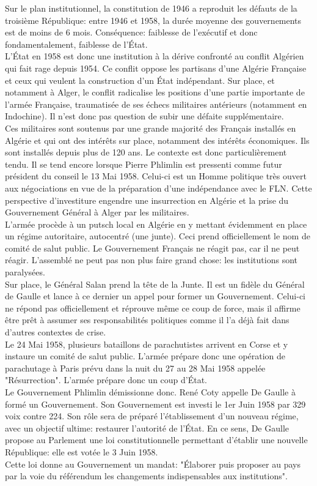 \documentclass[12pt, a4paper, openany]{book}
\begin{document}
Sur le plan institutionnel, la constitution de 1946 a reproduit les défauts de la troisième République: entre 1946 et 1958, la durée moyenne des gouvernements est de moins de 6 mois. Conséquence: faiblesse de l'exécutif et donc fondamentalement, faiblesse de l'État. \\
L'État en 1958 est donc une institution à la dérive confronté au conflit Algérien qui fait rage depuis 1954. Ce conflit oppose les partisans d'une Algérie Française et ceux qui veulent la construction d'un État indépendant. Sur place, et notamment à Alger, le conflit radicalise les positions d'une partie importante de l'armée Française, traumatisée de ses échecs militaires antérieurs (notamment en Indochine). Il n'est donc pas question de subir une défaite supplémentaire. \\
Ces militaires sont soutenus par une grande majorité des Français installés en Algérie et qui ont des intérêts sur place, notamment des intérêts économiques. Ils sont installés depuis plus de 120 ans. Le contexte est donc particulièrement tendu. Il se tend encore lorsque Pierre Phlimlin est pressenti comme futur président du conseil le 13 Mai 1958. Celui-ci est un Homme politique très ouvert aux négociations en vue de la préparation d'une indépendance avec le FLN. Cette perspective d'investiture engendre une insurrection en Algérie et la prise du Gouvernement Général à Alger par les militaires. \\
L'armée procède à un putsch local en Algérie en y mettant évidemment en place un régime autoritaire, autocentré (une junte). Ceci prend officiellement le nom de comité de salut public. Le Gouvernement Français ne réagit pas, car il ne peut réagir. L'assemblé ne peut pas non plus faire grand chose: les institutions sont paralysées. \\
Sur place, le Général Salan prend la tête de la Junte. Il est un fidèle du Général de Gaulle et lance à ce dernier un appel pour former un Gouvernement. Celui-ci ne répond pas officiellement et réprouve même ce coup de force, mais il affirme être prêt à assumer ses responsabilités politiques comme il l'a déjà fait dans d'autres contextes de crise. \\
Le 24 Mai 1958, plusieurs bataillons de parachutistes arrivent en Corse et y instaure un comité de salut public. L'armée prépare donc une opération de parachutage à Paris prévu dans la nuit du 27 au 28 Mai 1958 appelée "Résurrection". L'armée prépare donc un coup d'État. \\
Le Gouvernement Phlimlin démissionne donc. René Coty appelle De Gaulle à formé un Gouvernement. Son Gouvernement est investi le 1er Juin 1958 par 329 voix contre 224. Son rôle sera de préparé l'établissement d'un nouveau régime, avec un objectif ultime: restaurer l'autorité de l'État. En ce sens, De Gaulle propose au Parlement une loi constitutionnelle permettant d'établir une nouvelle République: elle est votée le 3 Juin 1958. \\ 
Cette loi donne au Gouvernement un mandat: "Élaborer puis proposer au pays par la voie du référendum les changements indispensables aux institutions".
\end{document}
